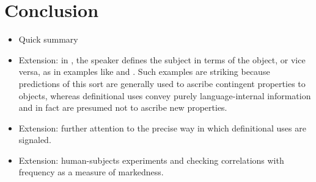 \section{Conclusion}\label{sec:conclusion}

\begin{itemize}
\item Quick summary

\item Extension: in , the
  speaker defines the subject in terms of the object, or vice versa,
  as in examples like  and
  .  Such examples are striking
  because predictions of this sort are generally used to ascribe
  contingent properties to objects, whereas definitional uses convey
  purely language-internal information and in fact are presumed not to
  ascribe new properties.

\item Extension: further attention to the precise way in which
  definitional uses are signaled.

\item Extension: human-subjects experiments and checking correlations
  with frequency as a measure of markedness.
\end{itemize}



